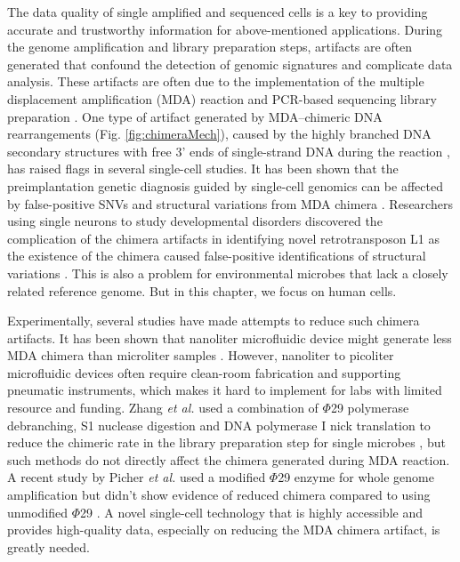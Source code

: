 The data quality of single amplified and sequenced cells is a key to providing accurate and trustworthy information for above-mentioned applications. During the genome amplification and library preparation steps, artifacts are often generated that confound the detection of genomic signatures and complicate data analysis. These artifacts are often due to the implementation of the multiple displacement amplification (MDA) reaction and PCR-based sequencing library preparation \cite{Lasken:2007db}. One type of artifact generated by MDA--chimeric DNA rearrangements (Fig. \ref{fig:chimeraMech}), caused by the highly branched DNA secondary structures with free 3' ends of single-strand DNA during the reaction \cite{Lasken:2007db}, has raised flags in several single-cell studies. It has been shown that the preimplantation genetic diagnosis guided by single-cell genomics can be affected by false-positive SNVs and structural variations from MDA chimera \cite{VanderAa:2013jz, Voet:2013hk}. Researchers using single neurons to study developmental disorders discovered the complication of the chimera artifacts in identifying novel retrotransposon L1 as the existence of the chimera caused false-positive identifications of structural variations \cite{Evrony:2016du, Evrony:2015it}. This is also a problem for environmental microbes that lack a closely related reference genome. But in this chapter, we focus on human cells.   


Experimentally, several studies have made attempts to reduce such chimera artifacts. It has been shown that nanoliter microfluidic device might generate less MDA chimera than microliter samples \cite{Marcy:2007il}. However, nanoliter to picoliter microfluidic devices often require clean-room fabrication and supporting pneumatic instruments, which makes it hard to implement for labs with limited resource and funding. Zhang \textit{et al.} used a combination of $\Phi$29 polymerase debranching, S1 nuclease digestion and DNA polymerase I nick translation to reduce the chimeric rate in the library preparation step for single microbes \cite{Zhang:2006hq}, but such methods do not directly affect the chimera generated during MDA reaction. A recent study by Picher \textit{et al.} used a modified $\Phi$29 enzyme for whole genome amplification but didn't show evidence of reduced chimera compared to using unmodified $\Phi$29 \cite{Picher:2016ki}. A novel single-cell technology that is highly accessible and provides high-quality data, especially on reducing the MDA chimera artifact, is greatly needed. 

